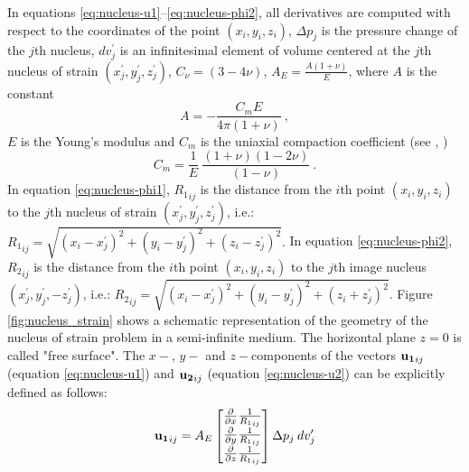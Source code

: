 \documentclass[P]{BrJG_submit}
\begin{document}
In equations \ref{eq:nucleus-u1}--\ref{eq:nucleus-phi2}, 
all derivatives are computed with respect to the coordinates of the point 
$(x_{i}, y_{i}, z_{i})$, 
$\Delta p_j$  is the pressure change of the $j$th nucleus, $dv_j^{\prime}$ is an 
infinitesimal element of volume centered at the $j$th nucleus of strain 
$(x^{\prime}_{j}, y^{\prime}_{j}, z^{\prime}_{j})$, 
$C_{\nu} = (3  -  4\nu)$, 
$A_{E} = \frac{A (1 + \nu)}{E}$,
where $A$ is the constant
\begin{equation}
A = - \frac{C_m E}{4 \pi (1 + \nu)} \: ,
\label{eq:nucleus-A}
\end{equation}
$E$ is the Young’s modulus and $C_m$ is the uniaxial compaction coefficient (see \citeauthor{Geertsma66}, 
\citeyear{Geertsma66}) 
\begin{equation}
C_m = \frac{1}{E} \: \frac{(1 + \nu) (1  - 2\nu)}{(1-\nu)} \: .
\label{eq:Cm}
\end{equation}
In equation \ref{eq:nucleus-phi1}, $ {R_1}_{ij}$ is the distance from the $i$th point $ (x_{i}, y_{i}, z_{i})$ to the $j$th nucleus of strain $(x^{\prime}_{j}, y^{\prime}_{j}, z^{\prime}_{j})$, i.e.:
${R_1}_{ij} = {\sqrt{(x_{i}- x^{\prime}_{j})^{2} + (y_{i} - y^{\prime}_{j})^{2} + 
(z_{i} - z^{\prime}_{j})^{2}}}.$
In equation \ref{eq:nucleus-phi2}, $ {R_2}_{ij}$ is the distance from the $i$th point $ (x_{i}, y_{i}, z_{i})$ to the $j$th image nucleus $(x^{\prime}_{j}, y^{\prime}_{j}, - z^{\prime}_{j})$, i.e.:
${R_2}_{ij} = {\sqrt{(x_{i}- x^{\prime}_{j})^{2} + (y_{i} - y^{\prime}_{j})^{2} + 
(z_{i} + z^{\prime}_{j})^{2}}}.$
Figure \ref{fig:nucleus_strain} shows a schematic representation of the geometry of the nucleus of strain problem in a semi-infinite medium. 
The horizontal plane $z = 0$ is called "free surface".
The $x-$, $y-$ and $z-$components of the vectors ${\bf{u_{1}}}_{ij}$ (equation \ref{eq:nucleus-u1}) and ${\bf{u_{2}}}_{ij}$ (equation \ref{eq:nucleus-u2}) can be explicitly defined as follows:
\begin{equation}
{\bf{u_{1}}}_{ij} = A_{E}
\begin{bmatrix} 
\frac{\partial }{\partial x} {\frac{1}{{R_1}_{ij}}}  \\
\frac{\partial }{\partial y} {\frac{1}{{R_1}_{ij}}}  \\
\frac{\partial }{\partial z} {\frac{1}{{R_1}_{ij}}} 
\end{bmatrix}
  \Delta p_{j} \:dv_j^{\prime}
\label{eq:nucleus-u1-vector}
\end{equation}
\end{document}
